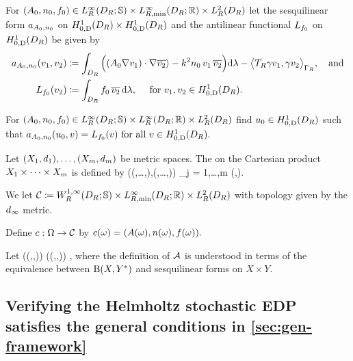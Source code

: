 
\noindent For $\mleft(\Az,\nz,\fz\mright) \in \LiRDRRRdtd \times \LiRminDRRR \times \LtRDR$ let the sesquilinear form $a_{A_{0},n_{0}}$ on $\HozDDR \times \HozDDR$  and the antilinear functional $L_{f_{0}}$ on $\HozDDR$ be given by
\begin{align*}
\aGm\mleft(\vo,\vt\mright) &\de \int_{D_R} \Big(\mleft(\Az \grad \vo\mright)\cdot \grad \vtb \rangle 
 - k^2 \nz\, \vo\,\vtb \Big)\dd\Leb- \big\langle T_R \gamma \vo,\gamma \vt\big\rangle_{\Gamma_R}, \quad\text{and}\\
 \Lh(\vt) &\de \int_{D_R} \fz\, \vtb\,\dd\Leb, \quad\text{ for } \vo, \vt \in \HozDDR.
\end{align*}
\ede

\label{prob:edpstoch}
For $\mleft(\Az,\nz,\fz\mright) \in \LiRDRRRdtd \times \LiRDRRR \times \LtRDR$ find 
$\uz \in \HozDDR$ such that $\aGm(\uz,v) = \Lh(v) \tforall v \in \HozDDR.$
\eprob

\label{def:dinfty}
Let $\mleft(\Xo,\done\mright),\ldots,\mleft(\Xm,\dm\mright)$ be metric spaces. The  on the Cartesian product $X_{1}\times\cdots\times X_{m}$ is defined by
\beqs
\dinfty\mleft(\mleft(\xo,\ldots,\xm\mright),\mleft(\yo,\ldots,\ym\mright)\mright) \de \max_{j = 1,\ldots,m} \dmetj\mleft(\xj,\yj\mright).
\eeqs
\ede


\label{def:cCHh}
We let
$\cC \de \WoiRminDRRRdtd \times \LiRminDRRR \times \LtRDR$
with topology given by the $d_{\infty}$ metric.
\ede


\label{def:inputmap}
Define $c:\Omega\rightarrow\mathcal C$ by
$\coeff(\omega) = \mleft(A(\omega),n(\omega),f(\omega)\mright).$
\ede

Let
\beq\label{eq:hhform}
\toform\mleft(\mleft(\Az,\nz,\fz\mright)\mright) \de \aGm \quad {} \quad \rhs\mleft(\mleft(\Az,\nz,\fz\mright)\mright) \de \Lh,
\eeq
where the definition of $\mathcal A$ is understood in terms of the equivalence between $\homspace$ and sesquilinear forms on $X \times Y.$
\ede

\subsection{Verifying the Helmholtz stochastic EDP satisfies the general conditions in \cref{sec:gen-framework}}\label{sec:hh-cond}

